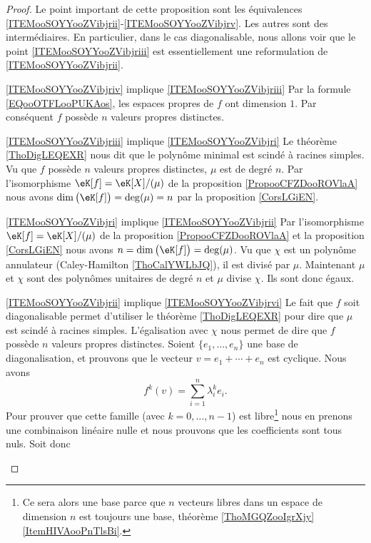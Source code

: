 \begin{proof}
    Le point important de cette proposition sont les équivalences \ref{ITEMooSOYYooZVibjrii}-\ref{ITEMooSOYYooZVibjrv}. Les autres sont des intermédiaires. En particulier, dans le cas diagonalisable, nous allons voir que le point \ref{ITEMooSOYYooZVibjriii} est essentiellement une reformulation de \ref{ITEMooSOYYooZVibjrii}.
    \begin{subproof}
        \item[\ref{ITEMooSOYYooZVibjriv} implique \ref{ITEMooSOYYooZVibjriii}]
            Par la formule \eqref{EQooOTFLooPUKAos}, les espaces propres de \( f\) ont dimension \( 1\). Par conséquent \( f\) possède \( n\) valeurs propres distinctes.
        \item[\ref{ITEMooSOYYooZVibjriii} implique \ref{ITEMooSOYYooZVibjri}]
            Le théorème \ref{ThoDigLEQEXR} nous dit que le polynôme minimal est scindé à racines simples. Vu que \( f\) possède \( n\) valeurs propres distinctes, \( \mu\) est de degré \( n\).  Par l'isomorphisme \( \eK[f]=\eK[X]/(\mu)\) de la proposition \ref{PropooCFZDooROVlaA} nous avons \(\dim\big( \eK[f] \big)= \deg(\mu)=n\) par la proposition \ref{CorsLGiEN}.
        \item[\ref{ITEMooSOYYooZVibjri} implique \ref{ITEMooSOYYooZVibjrii}]
            Par l'isomorphisme \( \eK[f]=\eK[X]/(\mu)\) de la proposition \ref{PropooCFZDooROVlaA} et la proposition \ref{CorsLGiEN} nous avons \(n=\dim\big( \eK[f] \big)= \deg(\mu)\). Vu que \( \chi\) est un polynôme annulateur (Caley-Hamilton \ref{ThoCalYWLbJQ}), il est divisé par \( \mu\). Maintenant \( \mu\) et \( \chi\) sont des polynômes unitaires de degré \( n\) et \( \mu\) divise \( \chi\). Ils sont donc égaux.
        \item[\ref{ITEMooSOYYooZVibjrii} implique \ref{ITEMooSOYYooZVibjrvi}]
            Le fait que $f$ soit diagonalisable permet d'utiliser le théorème \ref{ThoDigLEQEXR} pour dire que \( \mu\) est scindé à racines simples. L'égalisation avec \( \chi \) nous permet de dire que \( f\) possède \( n\) valeurs propres distinctes. Soient \( \{ e_1,\ldots, e_n \}\) une base de diagonalisation, et prouvons que le vecteur \( v=e_1+\cdots +e_n\) est cyclique. Nous avons
            \begin{equation}
                f^k(v)=\sum_{i=1}^n\lambda_i^ke_i.
            \end{equation}
            Pour prouver que cette famille (avec \( k=0,\ldots, n-1\)) est libre\footnote{Ce sera alors une base parce que \( n\) vecteurs libres dans un espace de dimension \( n\) est toujours une base, théorème \ref{ThoMGQZooIgrXjy}\ref{ItemHIVAooPnTlsBi}.} nous en prenons une combinaison linéaire nulle et nous prouvons que les coefficients sont tous nuls. Soit donc

\end{subproof}
\end{proof}

